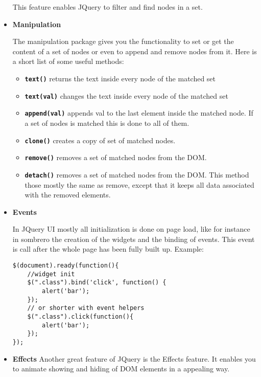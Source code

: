 \begin{itemize}
            This feature enables JQuery to filter and find nodes in a set.
        \item \textbf{Manipulation}

            The manipulation package gives you the functionality to set or get the content of a set of nodes or even to append and remove nodes from it.
            Here is a short list of some useful methods:

            \begin{itemize}
                \item \textbf{\lstinline!text()!}
                    returns the text inside every node of the matched set
                \item \textbf{\lstinline!text(val)!}
                    changes the text inside every node of the matched set
                \item \textbf{\lstinline!append(val)!}
                    appends val to the last element inside the matched node. If a set of nodes is matched this is done to all of them.
                \item \textbf{\lstinline!clone()!}
                    creates a copy of set of matched nodes.
                \item \textbf{\lstinline!remove()!}
                    removes a set of matched nodes from the DOM.
                \item \textbf{\lstinline!detach()!}
                    removes a set of matched nodes from the DOM. This method those mostly the same as remove, except that it keeps all data associated with the removed elements.
            \end{itemize}

        \item \textbf{Events}

            In JQuery UI mostly all initialization is done on page load, like for instance in sombrero the creation of the widgets and the binding of events. This event is call after the whole page has been fully built up.
            Example:

\begin{lstlisting}[caption=initiazitation of a JQuery UI widget,label=lst:jquery:initwidget]
$(document).ready(function(){
    //widget init
    $(".class").bind('click', function() {
        alert('bar');
    });
    // or shorter with event helpers
    $(".class").click(function(){
        alert('bar');
    });
});
\end{lstlisting}
        \item \textbf{Effects}
            Another great feature of JQuery is the Effects feature. It enables you to animate showing and hiding of DOM elements in a appealing way.
    \end{itemize}

